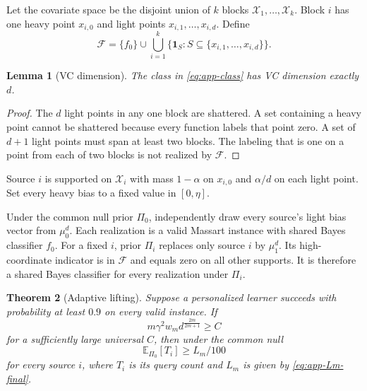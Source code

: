 \documentclass[twoside]{article}
\newtheorem{theorem}{Theorem}
\newtheorem{lemma}[theorem]{Lemma}
\newcommand{\E}{\mathbb E}
\newcommand{\cF}{\mathcal F}
\newcommand{\cX}{\mathcal X}
\newcommand{\1}{\mathbf 1}
\begin{document}
Let the covariate space be the disjoint union of $k$ blocks
$\cX_1,\ldots,\cX_k$. Block $i$ has one heavy point $x_{i,0}$ and light
points $x_{i,1},\ldots,x_{i,d}$. Define
\begin{equation}
 \cF=\{f_0\}\cup
 \bigcup_{i=1}^k\{\1_S:S\subseteq\{x_{i,1},\ldots,x_{i,d}\}\}.
 \label{eq:app-class}
\end{equation}

\begin{lemma}[VC dimension]
\label{lem:vc}
The class in \eqref{eq:app-class} has VC dimension exactly $d$.
\end{lemma}

\begin{proof}
The $d$ light points in any one block are shattered. A set containing a heavy
point cannot be shattered because every function labels that point zero. A
set of $d+1$ light points must span at least two blocks. The labeling that is
one on a point from each of two blocks is not realized by $\cF$.
\end{proof}

Source $i$ is supported on $\cX_i$ with mass $1-\alpha$ on $x_{i,0}$ and
$\alpha/d$ on each light point. Set every heavy bias to a fixed value in
$[0,\eta]$.

Under the common null prior $\Pi_0$, independently draw every source's light
bias vector from $\mu_0^d$. Each realization is a valid Massart instance with
shared Bayes classifier $f_0$. For a fixed $i$, prior $\Pi_i$ replaces only
source $i$ by $\mu_1^d$. Its high-coordinate indicator is in $\cF$ and equals
zero on all other supports. It is therefore a shared Bayes classifier for
every realization under $\Pi_i$.

\begin{theorem}[Adaptive lifting]
\label{thm:app-lifting}
Suppose a personalized learner succeeds with probability at least $0.9$ on
every valid instance. If
\begin{equation}
 m\gamma^2w_m d^{\frac{2m}{2m+1}}\ge C
 \label{eq:app-domination}
\end{equation}
for a sufficiently large universal $C$, then under the common null
\[
 \E_{\Pi_0}[T_i]\ge L_m/100
\]
for every source $i$, where $T_i$ is its query count and $L_m$ is given by
\eqref{eq:app-Lm-final}.
\end{theorem}
\end{document}
